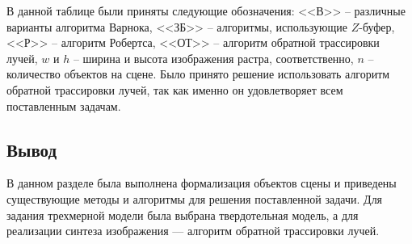 В данной таблице были приняты следующие обозначения: <<В>> -- различные варианты алгоритма Варнока, <<ЗБ>> -- алгоритмы, использующие $Z$-буфер, <<Р>> -- алгоритм Робертса,  <<ОТ>> -- алгоритм обратной трассировки лучей, $w$ и $h$ -- ширина и высота изображения растра, соответственно, $n$ -- количество объектов на сцене.
Было принято решение использовать алгоритм обратной трассировки лучей, так как именно он удовлетворяет всем поставленным задачам.

\subsection*{Вывод}

В данном разделе была выполнена формализация объектов сцены и приведены существующие методы и алгоритмы для решения поставленной задачи. 
Для задания трехмерной модели была выбрана твердотельная модель, а для реализации синтеза изображения --- алгоритм обратной трассировки лучей.

\newpage